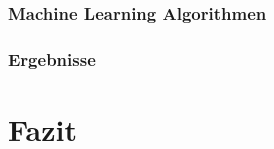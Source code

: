 \documentclass[
]{article}
\begin{document}
\hypertarget{machine-learning-algorithmen}{%
\subsubsection{Machine Learning
Algorithmen}\label{machine-learning-algorithmen}}

\hypertarget{ergebnisse}{%
\subsubsection{Ergebnisse}\label{ergebnisse}}

\hypertarget{fazit}{%
\section{Fazit}\label{fazit}}
\end{document}
